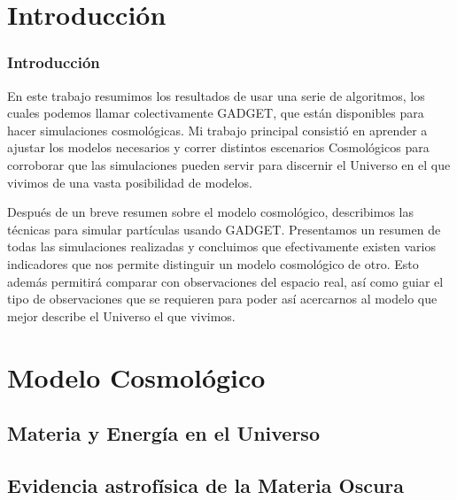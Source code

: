 \documentclass{beamer}
\begin{document}
\section{Introducción}
	\begin{frame}
		\frametitle{Introducción}
		\scriptsize
		
		En este trabajo resumimos los resultados de usar una serie de algoritmos, los cuales  podemos llamar colectivamente GADGET, que están disponibles para hacer simulaciones cosmológicas. Mi trabajo principal consistió en aprender a ajustar los modelos necesarios y correr distintos escenarios Cosmológicos para corroborar que las simulaciones pueden servir para discernir el Universo en el que vivimos de una vasta posibilidad de modelos.

		Después de un breve resumen sobre el modelo cosmológico, describimos las técnicas para simular partículas usando GADGET. Presentamos un resumen de todas las simulaciones realizadas y concluimos que efectivamente existen varios indicadores que nos permite distinguir un modelo cosmológico de otro. Esto además permitirá comparar con observaciones del espacio real, así como guiar el tipo de observaciones que se requieren para poder así acercarnos al modelo que mejor describe el Universo el que vivimos.
		
	\end{frame}

\section{Modelo Cosmológico}

\subsection{Materia y Energía en el Universo}
	\begin{frame}



	\end{frame}
\subsection{Evidencia astrofísica de la Materia Oscura}
	\begin{frame}



	\end{frame}
\end{document}
